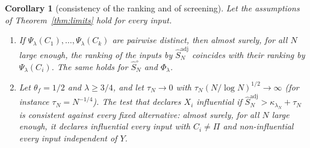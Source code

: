 \documentclass[11pt,a4paper]{article}
\newtheorem{corollary}[theorem]{Corollary}
\theoremstyle{definition}
\theoremstyle{remark}
\newcommand{\Sadj}{\hat S^{\mathrm{adj}}_N}
\newcommand{\Sun}{\hat S^{\circ}_N}
\begin{document}
\begin{corollary}[consistency of the ranking and of screening]\label{cor:ranking}
Let the assumptions of Theorem~\ref{thm:limits} hold for every input.
\begin{enumerate}[label=(\roman*)]
\item If $\Psi_\lambda(C_1),\dots,\Psi_\lambda(C_k)$ are pairwise distinct, then almost surely, for all $N$ large enough, the ranking of the inputs by $\Sadj$ coincides with their ranking by $\Psi_\lambda(C_i)$. The same holds for $\Sun$ and $\Phi_\lambda$.
\item Let $\theta_f=1/2$ and $\lambda\ge3/4$, and let $\tau_N\to0$ with $\tau_N(N/\log N)^{1/2}\to\infty$ (for instance $\tau_N=N^{-1/4}$). The test that declares $X_i$ influential if $\Sadj>\kappa_{\lambda_N}+\tau_N$ is consistent against every fixed alternative: almost surely, for all $N$ large enough, it declares influential every input with $C_i\neq\Pi$ and non-influential every input independent of $Y$.
\end{enumerate}
\end{corollary}
\end{document}
